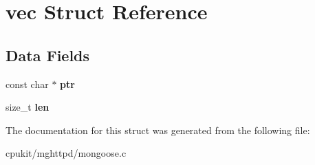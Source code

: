 \hypertarget{structvec}{}\section{vec Struct Reference}
\label{structvec}
\subsection*{Data Fields}
\begin{DoxyCompactItemize}
\item 
\mbox{\label{structvec_ae8b8fdc00d1598d046d14d0ae73a441a}} 
const char $\ast$ {\bfseries ptr}
\item 
\mbox{\label{structvec_a171ca107ac87f39c832a05621c99a17b}} 
size\+\_\+t {\bfseries len}
\end{DoxyCompactItemize}


The documentation for this struct was generated from the following file\+:\begin{DoxyCompactItemize}
\item 
cpukit/mghttpd/mongoose.\+c\end{DoxyCompactItemize}

